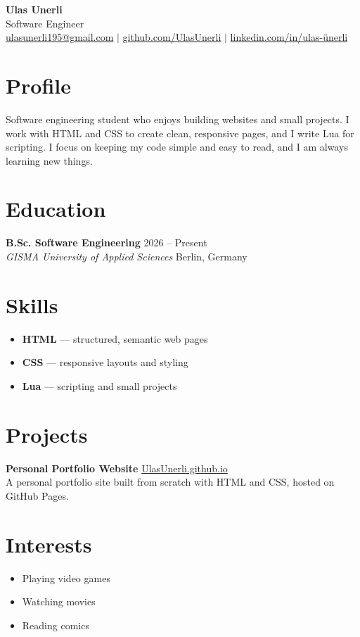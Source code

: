 \documentclass[11pt,a4paper]{article}
\begin{document}
\begin{center}
  {\Huge \bfseries \color{accent} Ulas Unerli}\\[4pt]
  {\large Software Engineer}\\[8pt]
  \href{mailto:ulasunerli195@gmail.com}{ulasunerli195@gmail.com} \quad$\vert$\quad
  \href{https://github.com/UlasUnerli}{github.com/UlasUnerli} \quad$\vert$\quad
  \href{https://www.linkedin.com/in/ulas-\%C3\%BCnerli-75b63922a/}{linkedin.com/in/ulas-ünerli}
\end{center}

\section{Profile}
Software engineering student who enjoys building websites and small projects.
I work with HTML and CSS to create clean, responsive pages, and I write Lua for
scripting. I focus on keeping my code simple and easy to read, and I am always
learning new things.

\section{Education}
\textbf{B.Sc. Software Engineering} \hfill 2026 -- Present\\
\textit{GISMA University of Applied Sciences} \hfill Berlin, Germany

\section{Skills}
\begin{itemize}
  \item \textbf{HTML} --- structured, semantic web pages
  \item \textbf{CSS} --- responsive layouts and styling
  \item \textbf{Lua} --- scripting and small projects
\end{itemize}

\section{Projects}
\textbf{Personal Portfolio Website} \hfill \href{https://github.com/UlasUnerli/UlasUnerli.github.io}{UlasUnerli.github.io}\\
A personal portfolio site built from scratch with HTML and CSS, hosted on
GitHub Pages.

\section{Interests}
\begin{itemize}
  \item Playing video games
  \item Watching movies
  \item Reading comics
\end{itemize}
\end{document}
